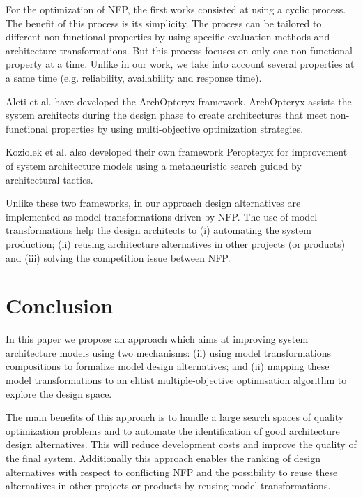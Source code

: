 \documentclass[conference]{IEEEtran}
\begin{document}
For the optimization of NFP, the first works consisted at using a cyclic process\cite{Bosch99softwarearchitecture}. The benefit of this process is its simplicity. The process can be tailored to different non-functional properties by using specific evaluation methods and architecture transformations. But this process focuses on only one non-functional property at a time. Unlike in our work, we take into account several properties at a same time (e.g. reliability, availability and response time).


Aleti et al.\cite{Gr5069138} have developed the ArchOpteryx framework. ArchOpteryx assists the system architects during the design phase to create architectures that meet non-functional properties by using multi-objective optimization strategies. 

Koziolek et al.\cite{Koziolek:2011:PAA:2000259.2000267} also developed their own framework Peropteryx for improvement of system architecture models using a metaheuristic search guided by architectural tactics.

Unlike these two frameworks, in our approach design alternatives are implemented as model transformations driven by NFP. The use of model transformations help the design architects to (i) automating the system production; (ii) reusing architecture alternatives in other projects (or products) and (iii) solving the competition issue between NFP. 

\section{Conclusion}
\label{Conclu}

In this paper we propose an approach which aims at improving system architecture models using two mechanisms: (ii) using model transformations compositions to formalize model design alternatives; and (ii) mapping these model transformations to an elitist multiple-objective optimisation algorithm to explore the design space.

The main benefits of this approach is to handle a large search spaces of quality optimization problems and to automate the identification of good architecture design alternatives. This will reduce development costs and improve the quality of the final system. Additionally this approach enables the ranking of design alternatives with respect to conflicting NFP and the possibility to reuse these alternatives in other projects or products by reusing model transformations.
\end{document}
